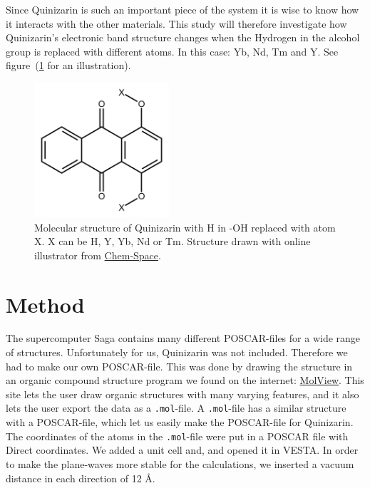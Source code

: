 \documentclass{article}
\begin{document}
    Since Quinizarin is such an important piece of the system it is wise to know how it interacts with the other materials. This study will therefore investigate how Quinizarin's electronic band structure changes when the Hydrogen in the alcohol group is replaced with different atoms. In this case: Yb, Nd, Tm and Y. See figure~(\ref{fig:Quinizarin-X} for an illustration).\\

    \begin{figure}[H]
        \centering
        \includegraphics[width = 5cm]{../fig/quinizarin-x.png}
        \caption{Molecular structure of Quinizarin with H in -OH replaced with atom X. X can be H, Y, Yb, Nd or Tm. Structure drawn with online illustrator from \href{https://chem-space.com/search}{Chem-Space}.}
        \label{fig:Quinizarin-X}
    \end{figure}

\vspace{1cm}

\section{Method}    \label{sec:Method}

  The supercomputer Saga contains many different POSCAR-files for a wide range of structures. Unfortunately for us, Quinizarin was not included. Therefore we had to make our own POSCAR-file. This was done by drawing the structure in an organic compound structure program we found on the internet: \href{https://molview.org}{MolView}. This site lets the user draw organic structures with many varying features, and it also lets the user export the data as a \texttt{.mol}-file. A \texttt{.mol}-file has a similar structure with a POSCAR-file, which let us easily make the POSCAR-file for Quinizarin. \\

  The coordinates of the atoms in the \texttt{.mol}-file were put in a POSCAR file with Direct coordinates. We added a unit cell and, and opened it in VESTA. In order to make the plane-waves more stable for the calculations, we inserted a vacuum distance in each direction of 12 Å. \\
\end{document}
